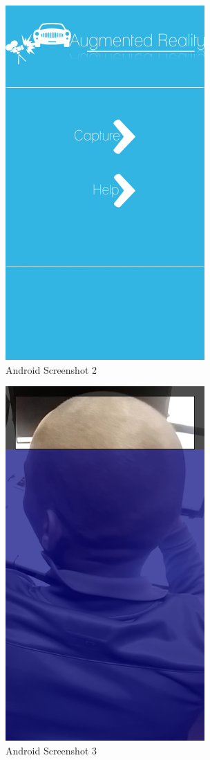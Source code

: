 \documentclass[12pt]{article}
\begin{document}
							\begin{figure}[tp]
		                             \centering
		                             \includegraphics[width=3in, height=5.333in]{Pictures/Screenshots_2.png}
		                             \caption{Android Screenshot 2}
		              		\end{figure}
							\begin{figure}[tp]
		                             \centering
		                             \includegraphics[width=3in, height=5.333in]{Pictures/Screenshots_3.png}
		                             \caption{Android Screenshot 3}
		              		\end{figure}
\end{document}
